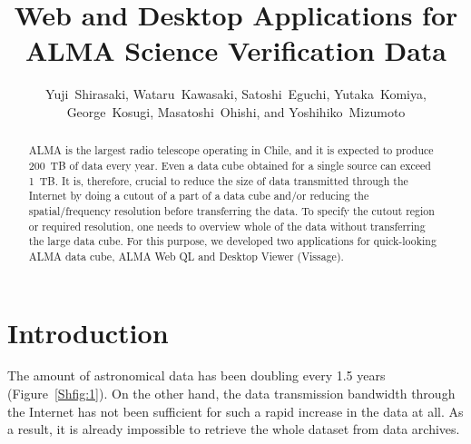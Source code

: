 
\resetcounters




\title{Web and Desktop Applications for ALMA Science Verification Data}

\author{Yuji~Shirasaki, Wataru~Kawasaki, Satoshi~Eguchi, Yutaka~Komiya, George~Kosugi, Masatoshi~Ohishi, and Yoshihiko~Mizumoto
}


\begin{abstract}
ALMA is the largest radio telescope operating in Chile, and 
it is expected to produce 200~TB of data every year. 
Even a data cube obtained for a single source can exceed 1~TB.
It is, therefore, crucial to reduce the size of data transmitted through 
the Internet by doing a cutout of a part of a data cube and/or 
reducing the spatial/frequency resolution before transferring the data. 
To specify the cutout region or required resolution, one needs to overview
whole of the data without transferring the large data cube. 
For this purpose, we developed two applications for quick-looking 
ALMA data cube, ALMA Web QL and Desktop Viewer (Vissage). 
\end{abstract}

\section{Introduction}

The amount of astronomical data has been doubling every 1.5 years 
(Figure~\ref{Shfig:1}).
On the other hand, the data transmission bandwidth through the Internet 
has not been sufficient for such a rapid increase in the data at all. 
As a result, it is already impossible to retrieve the whole dataset from 
data archives. 

